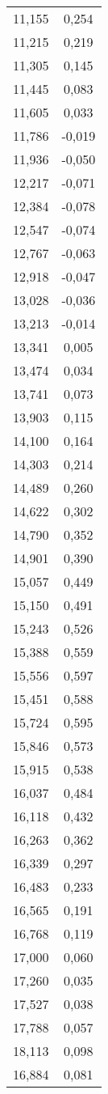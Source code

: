 \begin{longtable}{c c}
	11,155&0,254 \\
	11,215&0,219 \\
	11,305&0,145 \\
	11,445&0,083 \\
	11,605&0,033 \\
	11,786&-0,019 \\
	11,936&-0,050 \\
	12,217&-0,071 \\
	12,384&-0,078 \\
	12,547&-0,074 \\
	12,767&-0,063 \\
	12,918&-0,047 \\
	13,028&-0,036 \\
	13,213&-0,014 \\
	13,341&0,005 \\
	13,474&0,034 \\
	13,741&0,073 \\
	13,903&0,115 \\
	14,100&0,164 \\
	14,303&0,214 \\
	14,489&0,260 \\
	14,622&0,302 \\
	14,790&0,352 \\
	14,901&0,390 \\
	15,057&0,449 \\
	15,150&0,491 \\
	15,243&0,526 \\
	15,388&0,559 \\
	15,556&0,597 \\
	15,451&0,588 \\
	15,724&0,595 \\
	15,846&0,573 \\
	15,915&0,538 \\
	16,037&0,484 \\
	16,118&0,432 \\
	16,263&0,362 \\
	16,339&0,297 \\
	16,483&0,233 \\
	16,565&0,191 \\
	16,768&0,119 \\
	17,000&0,060 \\
	17,260&0,035 \\
	17,527&0,038 \\
	17,788&0,057 \\
	18,113&0,098 \\
	16,884&0,081 \\

\end{longtable}
